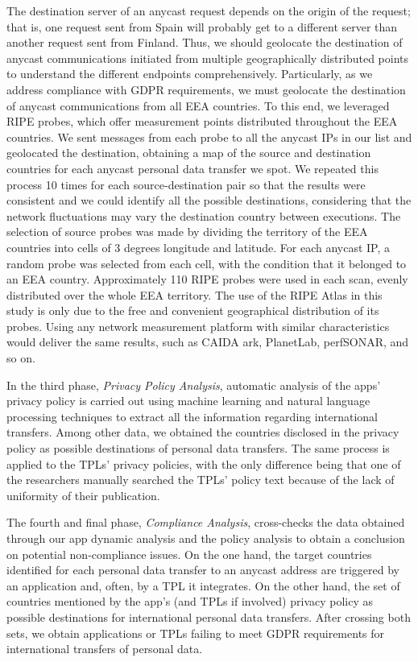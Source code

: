 \documentclass{article}
\begin{document}
The destination server of an anycast request depends on the origin of the request; that is, one request sent from Spain will probably get to a different server than another request sent from Finland. Thus, we should geolocate the destination of anycast communications initiated from multiple geographically distributed points to understand the different endpoints comprehensively. Particularly, as we address compliance with GDPR requirements, we must geolocate the destination of anycast communications from all EEA countries. To this end, we leveraged RIPE \cite{HomeAtlas} probes, which offer measurement points distributed throughout the EEA countries. We sent messages from each probe to all the anycast IPs in our list and geolocated the destination, obtaining a map of the source and destination countries for each anycast personal data transfer we spot. We repeated this process 10 times for each source-destination pair so that the results were consistent and we could identify all the possible destinations, considering that the network fluctuations may vary the destination country between executions. The selection of source probes was made by dividing the territory of the EEA countries into cells of 3 degrees longitude and latitude. For each anycast IP, a random probe was selected from each cell, with the condition that it belonged to an EEA country. Approximately 110 RIPE probes were used in each scan, evenly distributed over the whole EEA territory. The use of the RIPE Atlas in this study is only due to the free and convenient geographical distribution of its probes. Using any network measurement platform with similar characteristics would deliver the same results, such as CAIDA ark, PlanetLab, perfSONAR, and so on.

In the third phase, \textit{Privacy Policy Analysis}, automatic analysis of the apps' privacy policy is carried out using machine learning and natural language processing techniques to extract all the information regarding international transfers. Among other data, we obtained the countries disclosed in the privacy policy as possible destinations of personal data transfers. The same process is applied to the TPLs' privacy policies, with the only difference being that one of the researchers manually searched the TPLs' policy text because of the lack of uniformity of their publication.

The fourth and final phase, \textit{Compliance Analysis}, cross-checks the data obtained through our app dynamic analysis and the policy analysis to obtain a conclusion on potential non-compliance issues. On the one hand, the target countries identified for each personal data transfer to an anycast address are triggered by an application and, often, by a TPL it integrates. On the other hand, the set of countries mentioned by the app's (and TPLs if involved) privacy policy as possible destinations for international personal data transfers. After crossing both sets, we obtain applications or TPLs failing to meet GDPR requirements for international transfers of personal data.
\end{document}
